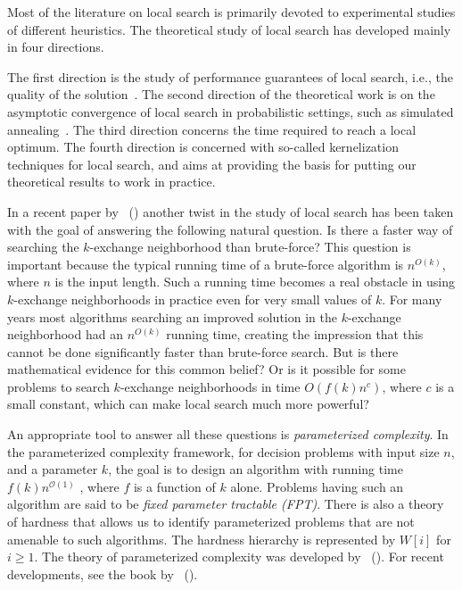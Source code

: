\documentclass[10pt,usletter]{article}
\newcommand{\cO}{\mathcal{O}}
\newcommand{\citex}[1]{\citeauthor{#1}~(\citeyear{#1})}
\begin{document}
Most of the literature on local search is primarily devoted to
experimental studies of different heuristics. The theoretical study of
local search has developed mainly in four directions.

The first direction is the study of performance guarantees of local
search, i.e., the quality of the
solution~\citep{Alimonti95,Alimonti97,GuptaTardos00,KhannaMotwaniSudanVazirani98,PapadimitriouSteiglit77}. The
second direction of the theoretical work is on the asymptotic
convergence of local search in probabilistic settings, such as simulated
annealing~\citep{AartsKorstLaarhoven97}. The third direction
concerns the time required to reach a local optimum.  The fourth
direction is concerned with so-called kernelization techniques
\citep{GuoNiedermeier07} for local search, and aims at providing the
basis for putting our theoretical results to work in practice.

In a recent paper by \citex{FellowsRosamondFominLokshtanovSaurabhVillanger09} another twist in the study of local
search has been taken with the goal of answering the following natural question.
Is there a faster way of searching the $k$-exchange neighborhood
than brute-force? This question is important because
the typical running time of a brute-force algorithm is $n^{O(k)}$,
where $n$ is the input length. Such a running time becomes a real obstacle
in using $k$-exchange neighborhoods in practice even for very
small values of $k$. For many years most algorithms
searching an improved solution in the $k$-exchange neighborhood
had an $n^{O(k)}$ running time, creating the impression
that this cannot be done significantly faster than
brute-force search. But is there mathematical evidence for
this common belief? Or is it possible for some problems
to search $k$-exchange neighborhoods in time $O(f(k)n^c)$,
where $c$ is a small constant, which can make local search
much more powerful?

An appropriate tool to answer all these questions is \emph{parameterized
complexity}. In the parameterized complexity framework, for decision
problems with input size $n$, and a parameter $k$, the goal is to
design an algorithm with running time $f(k)n^{\cO(1)}$ , where $f$ is
a function of $k$ alone. Problems having such an algorithm are said to
be \emph{fixed parameter tractable (FPT)}. There is also a theory of hardness
that allows us to identify parameterized problems that are not
amenable to such algorithms. The hardness hierarchy is represented by
$W[i]$ for $i\geq 1$. The theory of parameterized complexity was developed by 
\citex{DowneyFellows99}. For recent developments, see the book by
\citex{FlumGrohe06}.
\end{document}

